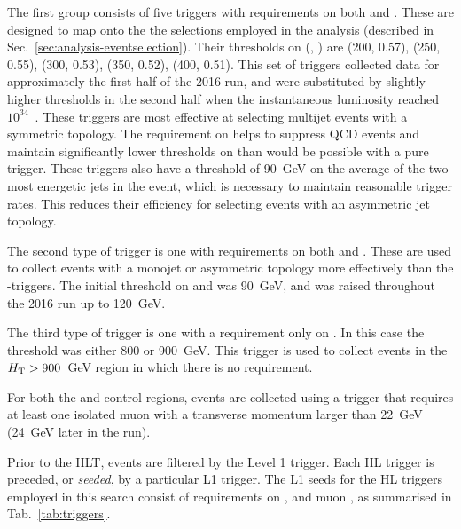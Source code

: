 The first group consists of five triggers with requirements on both \scalht and 
\alphat. These are designed to map onto the the selections employed in the 
analysis (described in Sec.~\ref{sec:analysis-eventselection}). Their 
thresholds on (\scalht, \alphat) are (200, 0.57), (250, 0.55), (300, 0.53), 
(350, 0.52), (400, 0.51). This set of triggers collected data for approximately 
the first half of the 2016 run, and were substituted by slightly higher \alphat 
thresholds in the second half when the instantaneous luminosity reached 
$10^{34}$~\lumiunits. 
These triggers are most effective at selecting multijet events with a symmetric 
topology. The requirement on \alphat helps to suppress QCD events and maintain 
significantly lower thresholds on \scalht than would be possible with a pure 
\scalht trigger.
These triggers also have a threshold of 90~GeV on the average \pt of the two 
most energetic jets in the event, which is necessary to maintain reasonable 
trigger rates. This reduces their efficiency for selecting events with an 
asymmetric jet topology.

The second type of trigger is one with requirements on both \met and \mht. 
These are used to collect events with a monojet or asymmetric topology more 
effectively than the \scalht-\alphat triggers. The initial threshold on \met 
and \mht was 90~GeV, and was raised throughout the 2016 run up to 120~GeV.

The third type of trigger is one with a requirement only on \scalht. In this 
case the threshold was either 800 or 900~GeV. This trigger is used to collect 
events in the $\mbox{$H_\text{T}$}>900$~GeV region in which there is no \alphat requirement.

For both the \mj and \mmj control regions, events are collected using a trigger 
that requires at least one isolated muon with a transverse momentum larger than 
22~GeV (24~GeV later in the run).

Prior to the HLT, events are filtered by the Level 1 trigger. Each HL trigger 
is preceded, or \textit{seeded}, by a particular L1 trigger. The L1 seeds for 
the HL triggers employed in this search consist of requirements on \scalht, 
\met and muon \pt, as summarised in Tab.~\ref{tab:triggers}. 

